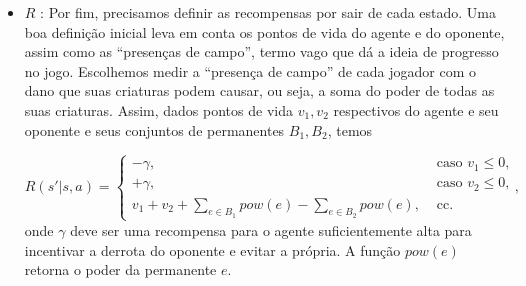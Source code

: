 \documentclass{book}
\renewcommand{\le}{\leqslant}
\begin{document}
\begin{itemize}
\item $R$ : Por fim, precisamos definir as recompensas por sair de cada estado. Uma boa definição inicial leva em conta os pontos de vida do agente e do oponente, assim como as ``presenças de campo'', termo vago que dá a ideia de progresso no jogo. Escolhemos medir a ``presença de campo'' de cada jogador com o dano que suas criaturas podem causar, ou seja, a soma do poder de todas as suas criaturas. Assim, dados pontos de vida $v_1, v_2$ respectivos do agente e seu oponente e seus conjuntos de permanentes $B_1, B_2$, temos

\begin{equation}
  R(s'|s, a) = \begin{cases}
              -\gamma, &\textrm{ caso $v_1 \le 0$,} \\
              +\gamma, &\textrm{ caso $v_2 \le 0$,} \\
              v_1 + v_2 + \sum\limits_{e \in B_1} pow(e) - \sum\limits_{e \in B_2} pow(e), &\textrm{ cc.}
            \end{cases},
\end{equation}
onde $\gamma$ deve ser uma recompensa para o agente suficientemente alta para incentivar a derrota do oponente e evitar a própria. A função $pow(e)$ retorna o poder da permanente $e$.

\end{itemize}
\end{document}
